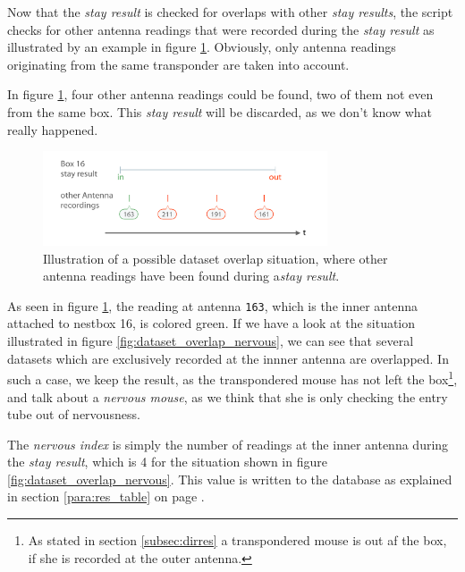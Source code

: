 Now that the \textit{stay result} is checked for overlaps with other \textit{stay results}, the script checks for other antenna readings that were recorded during the \textit{stay result} as illustrated by an example in figure \ref{fig:dataset_overlap}. Obviously, only antenna readings originating from the same transponder are taken into account.

In figure \ref{fig:dataset_overlap}, four other antenna readings could be found, two of them not even from the same box. This \textit{stay result} will be discarded, as we don't know what really happened.

\begin{figure}[htpb]
\begin{center}
  \includegraphics[width=0.75\textwidth]{assets/pdf/dataset_overlap_schema.pdf}
  \caption[Dataset overlap illustration]{Illustration of a possible dataset overlap situation, where other antenna readings have been found during a\textit{stay result}.}
  \label{fig:dataset_overlap}
\end{center}
\end{figure}

As seen in figure \ref{fig:dataset_overlap}, the reading at antenna \lstinline|163|, which is the inner antenna attached to nestbox 16, is colored green. If we have a look at the situation illustrated in figure \ref{fig:dataset_overlap_nervous}, we can see that several datasets which are exclusively recorded at the innner antenna are overlapped. In such a case, we keep the result, as the transpondered mouse has not left the box\footnote{As stated in section \ref{subsec:dirres} a transpondered mouse is out af the box, if she is recorded at the outer antenna.}, and talk about a \textit{nervous mouse}, as we think that she is only checking the entry tube out of nervousness.

The \textit{nervous index} is simply the number of readings at the inner antenna during the \textit{stay result}, which is 4 for the situation shown in figure \ref{fig:dataset_overlap_nervous}. This value is written to the database as explained in section \ref{para:res_table} on page \pageref{para:res_table}.

